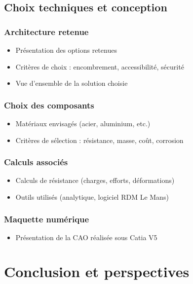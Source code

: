\documentclass[12pt,a4paper]{report}
\begin{document}
\section{Choix techniques et conception}

\subsection{Architecture retenue}
\begin{itemize}
  \item Présentation des options retenues
  \item Critères de choix : encombrement, accessibilité, sécurité
  \item Vue d’ensemble de la solution choisie
\end{itemize}
\subsection{Choix des composants}
\begin{itemize}
  \item Matériaux envisagés (acier, aluminium, etc.)
  \item Critères de sélection : résistance, masse, coût, corrosion
\end{itemize}
\subsection{Calculs associés}
\begin{itemize}
  \item Calculs de résistance (charges, efforts, déformations)
  \item Outils utilisés (analytique, logiciel RDM Le Mans)
\end{itemize}
\subsection{Maquette numérique}
\begin{itemize}
  \item Présentation de la CAO réalisée sous Catia V5
\end{itemize}







\chapter{Conclusion et perspectives}
\end{document}
